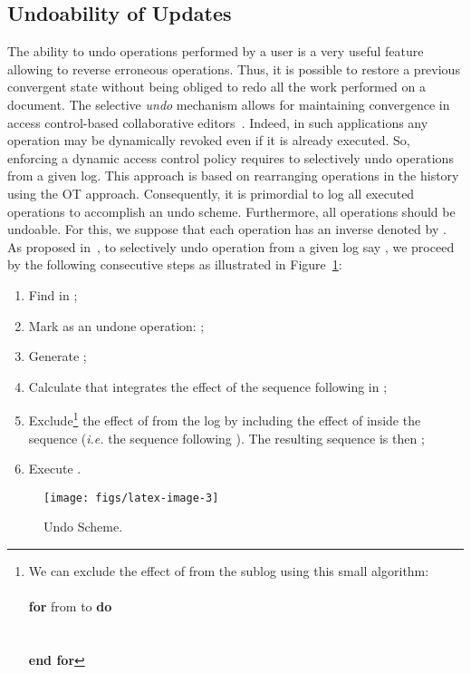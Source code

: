\documentclass[submission,copyright,creativecommons]{eptcs}
\begin{document}
\subsection{Undoability of Updates}\label{sec:undo}
The ability to undo operations performed by a user   is a   very useful feature allowing to reverse erroneous operations. Thus, it is possible to restore a previous convergent state without being obliged to redo all the work performed on a document.
  The selective \emph{undo} mechanism allows for maintaining convergence in access control-based collaborative editors~\cite{CherifIR11}. Indeed, in such applications any operation may be dynamically  revoked even if it is already executed. So, enforcing a dynamic access control policy requires to selectively undo operations from a given log. This approach  is based on rearranging operations in the history using the  OT approach. 
Consequently, it is primordial to log all executed operations to accomplish an undo scheme. Furthermore, all operations should be undoable. For this, we suppose that each operation  has an inverse denoted by . As proposed in~\cite{Atul94,Sun02}, to
selectively undo operation  from a given log say , we proceed by the following consecutive steps as illustrated in Figure~\ref{fig:undoScheme}:
\begin{enumerate}[(1)]
  \item Find  in ;\vspace{-1.5mm}
  \item Mark  as an undone operation: ;\vspace{-1.5mm}
  \item Generate ;\vspace{-1.5mm}
  \item Calculate  that integrates the effect of the sequence following  in ;\vspace{-1.5mm}
  \item Exclude\footnote{We can exclude the effect of  from the sublog  using this small algorithm:\\
  \\
 \textbf{for}  from  to  \textbf{do}\\
 \\
 \\
 \textbf{end for}
  } the effect of  from the log by including the effect of  inside the sequence
   (\textit{i.e.} the sequence following ). 
  The resulting sequence   is then ;\vspace{-1.5mm}
  \item Execute .
\end{enumerate}
\begin{figure}[!h]
\vspace{-.5cm}
\begin{scriptsize}
\centerline{\texttt{[image: figs/latex-image-3]}}
\end{scriptsize}
\vspace{-.2cm}
\caption{Undo Scheme.}\label{fig:undoScheme}
\end{figure}
 
\end{document}
